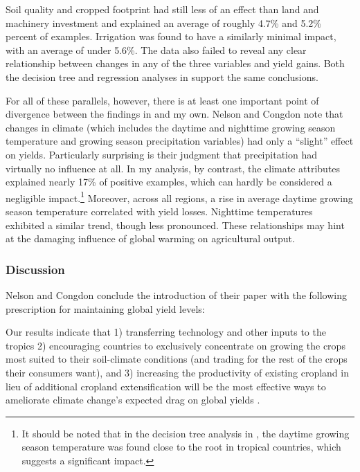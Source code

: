 \documentclass[12pt,twoside]{article}
\begin{document}
Soil quality and cropped footprint had still less of an effect than land and machinery investment and explained an average of roughly 4.7\% and 5.2\% percent of examples. Irrigation was found to have a similarly minimal impact, with an average of under 5.6\%. The data also failed to reveal any clear relationship between changes in any of the three variables and yield gains. Both the decision tree and regression analyses in \cite{nelson_measuring_2016} support the same conclusions.

For all of these parallels, however, there is at least one important point of divergence between the findings in \cite{nelson_measuring_2016} and my own. Nelson and Congdon note that changes in climate (which includes the daytime and nighttime growing season temperature and growing season precipitation variables) had only a ``slight'' effect on yields. Particularly surprising is their judgment that precipitation had virtually no influence at all. In my analysis, by contrast, the climate attributes explained nearly 17\% of positive examples, which can hardly be considered a negligible impact.\footnote{It should be noted that in the decision tree analysis in \cite{nelson_measuring_2016}, the daytime growing season temperature was found close to the root in tropical countries, which suggests a significant impact.} Moreover, across all regions, a rise in average daytime growing season temperature correlated with yield losses. Nighttime temperatures exhibited a similar trend, though less pronounced. These relationships may hint at the damaging influence of global warming on agricultural output.

\subsubsection{Discussion}

Nelson and Congdon conclude the introduction of their paper with the following prescription for maintaining global yield levels:

\begin{displayquote}
Our results indicate that 1) transferring technology and other inputs to the tropics 2) encouraging countries to exclusively concentrate on growing the crops most suited to their soil-climate conditions (and trading for the rest of the crops their consumers want), and 3) increasing the productivity of existing cropland in lieu of additional cropland extensification will be the most effective ways to ameliorate climate change's expected drag on global yields \cite{nelson_measuring_2016}.
\end{displayquote}
\end{document}
